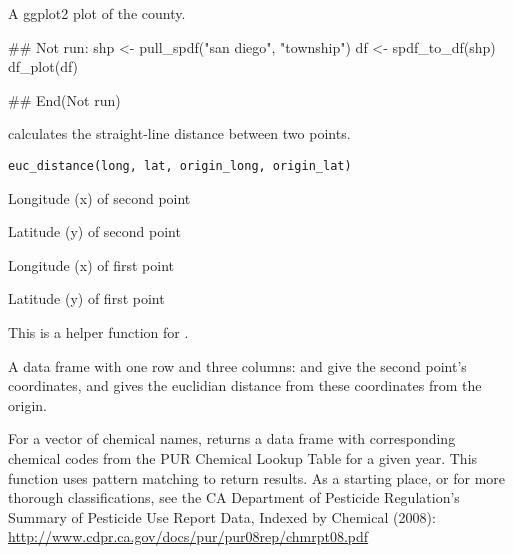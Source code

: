 \documentclass[a4paper]{book}
\begin{document}
%
\begin{Value}
A ggplot2 plot of the county.
\end{Value}
%
\begin{Examples}
\begin{ExampleCode}
## Not run:
shp <- pull_spdf("san diego", "township")
df <- spdf_to_df(shp)
df_plot(df)

## End(Not run)
\end{ExampleCode}
\end{Examples}
%
\begin{Description}\relax
{} calculates the straight-line distance between
two points.
\end{Description}
%
\begin{Usage}
\begin{verbatim}
euc_distance(long, lat, origin_long, origin_lat)
\end{verbatim}
\end{Usage}
%
\begin{Arguments}
\begin{ldescription}
\item[\code{long}] Longitude (x) of second point

\item[\code{lat}] Latitude (y) of second point

\item[\code{origin\_long}] Longitude (x) of first point

\item[\code{origin\_lat}] Latitude (y) of first point
\end{ldescription}
\end{Arguments}
%
\begin{Details}\relax
This is a helper function for .
\end{Details}
%
\begin{Value}
A data frame with one row and three columns:  and
 give the second point's coordinates, and  gives the
euclidian distance from these coordinates from the origin.
\end{Value}
%
\begin{Description}\relax
For a vector of chemical names,  returns
a data frame with corresponding chemical codes from the PUR Chemical Lookup
Table for a given year. This function uses pattern matching to return results.
As a starting place, or for more thorough classifications, see the CA
Department of Pesticide Regulation's Summary of Pesticide Use Report Data,
Indexed by Chemical (2008):
\url{http://www.cdpr.ca.gov/docs/pur/pur08rep/chmrpt08.pdf}
\end{Description}
\end{document}
